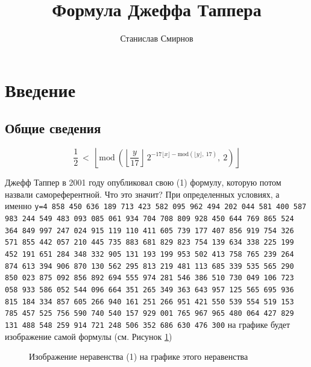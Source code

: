 \documentclass[a4paper,12pt]{article}
\title{Формула Джеффа Таппера}
\author{Станислав Смирнов}
\begin{document}
\maketitle

\section{Введение}
\subsection{Общие сведения}
\begin{equation}\label{eq:tupper}
  \frac{1}{2} \: < \: \left\lfloor \mathrm{mod}\: \left( \left\lfloor \frac{y}{17} \right\rfloor \: 2^{-17 \lfloor x \rfloor - \mathrm{mod} \left( \lfloor y \rfloor, \: 17 \right)} ,\: 2 \right) \right\rfloor
\end{equation}

Джефф Таппер в 2001 году опубликовал свою (1) формулу, которую потом назвали самореферентной. Что это значит? При определенных условиях, а именно
\texttt{y=4 858 450 636 189 713 423 582 095 962 494 202 044 581 400 587 983 244 549 483 093 085 061 934 704 708 809 928 450 644 769 865 524 364 849 997 247 024 915 119 110 411 605 739 177 407 856 919 754 326 571 855 442 057 210 445 735 883 681 829 823 754 139 634 338 225 199 452 191 651 284 348 332 905 131 193 199 953 502 413 758 765 239 264 874 613 394 906 870 130 562 295 813 219 481 113 685 339 535 565 290 850 023 875 092 856 892 694 555 974 281 546 386 510 730 049 106 723 058 933 586 052 544 096 664 351 265 349 363 643 957 125 565 695 936 815 184 334 857 605 266 940 161 251 266 951 421 550 539 554 519 153 785 457 525 756 590 740 540 157 929 001 765 967 965 480 064 427 829 131 488 548 259 914 721 248 506 352 686 630 476 300}
на графике будет изображение самой формулы (см. Рисунок \ref{fig:selfref})\\

\begin{figure}[h]
\caption{Изображение неравенства (1) на графике этого неравенства}
\label{fig:selfref}
\end{figure}
\end{document}
